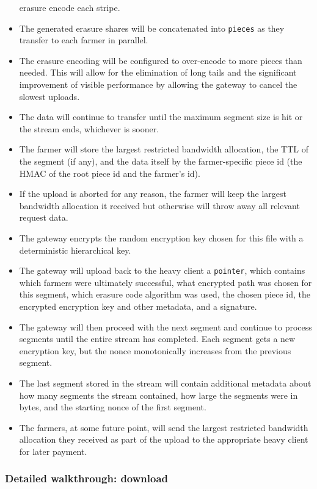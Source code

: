 \documentclass[a4paper,10pt]{article} \usepackage[utf8]{inputenc}
\newcommand{\x}[1]{{\tt #1}} \newcommand{\code}[1]{{\tt #1}}
\begin{document}
\begin{itemize}
  erasure encode each stripe.
\item The generated erasure shares will be concatenated into \x{pieces} as they
  transfer to each farmer in parallel.
\item The erasure encoding will be configured to over-encode to more pieces
  than needed. This will allow for the elimination of long tails and the
  significant improvement of visible performance by allowing the gateway to
  cancel the slowest uploads.
\item The data will continue to transfer until the maximum segment size is hit
  or the stream ends, whichever is sooner.
\item The farmer will store the largest restricted bandwidth allocation, the
  TTL of the segment (if any), and the data itself by the farmer-specific piece
  id (the HMAC of the root piece id and the farmer's id).
\item If the upload is aborted for any reason, the farmer will keep the
  largest bandwidth allocation it received but otherwise will throw away all
  relevant request data.
\item The gateway encrypts the random encryption key chosen for this file
  with a deterministic hierarchical key.
\item The gateway will upload back to the heavy client a \x{pointer}, which
  contains which farmers were
  ultimately successful, what encrypted path was chosen for this segment, which
  erasure code algorithm was used, the chosen piece id, the
  encrypted encryption key and other metadata, and a signature.
\item The gateway will then proceed with the next segment and continue to
  process segments until the entire stream has completed. Each segment gets
  a new encryption key, but the nonce monotonically increases from the previous
  segment.
\item The last segment stored in the stream will contain additional metadata
  about how many segments the stream contained, how large the segments were
  in bytes, and the starting nonce of the first segment.
\item The farmers, at some future point, will send the largest restricted
  bandwidth allocation they received as part of the upload to the appropriate
  heavy client for later payment.
\end{itemize}

\subsubsection{Detailed walkthrough: download}
\end{document}
